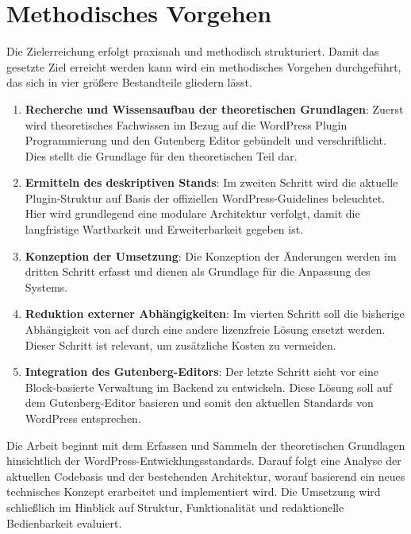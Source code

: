 \section{Methodisches Vorgehen}

Die Zielerreichung erfolgt praxisnah und methodisch strukturiert.
Damit das gesetzte Ziel erreicht werden kann wird ein methodisches Vorgehen durchgeführt, das sich in vier größere Bestandteile gliedern lässt.

\begin{enumerate}
    \item \textbf{Recherche und Wissensaufbau der theoretischen Grundlagen}: Zuerst wird theoretisches Fachwissen im Bezug auf die WordPress Plugin Programmierung und den Gutenberg Editor gebündelt und verschriftlicht.
    Dies stellt die Grundlage für den theoretischen Teil dar.

    \item \textbf{Ermitteln des deskriptiven Stands}: Im zweiten Schritt wird die aktuelle Plugin-Struktur auf Basis der offiziellen WordPress-Guidelines beleuchtet.
    Hier wird grundlegend eine modulare Architektur verfolgt, damit die langfristige Wartbarkeit und Erweiterbarkeit gegeben ist.

    \item \textbf{Konzeption der Umsetzung}: Die Konzeption der Änderungen werden im dritten Schritt erfasst und dienen als Grundlage für die Anpassung des Systems.

    \item \textbf{Reduktion externer Abhängigkeiten}: Im vierten Schritt soll die bisherige Abhängigkeit von \gls{acf} durch eine andere lizenzfreie Lösung ersetzt werden.
    Dieser Schritt ist relevant, um zusätzliche Kosten zu vermeiden.

    \item \textbf{Integration des Gutenberg-Editors}: Der letzte Schritt sieht vor eine Block-basierte Verwaltung im Backend zu entwickeln.
    Diese Lösung soll auf dem Gutenberg-Editor basieren und somit den aktuellen Standards von WordPress entsprechen.
\end{enumerate}

Die Arbeit beginnt mit dem Erfassen und Sammeln der theoretischen Grundlagen hinsichtlich der WordPress-Entwicklungsstandards.
Darauf folgt eine Analyse der aktuellen Codebasis und der bestehenden Architektur, worauf basierend ein neues technisches Konzept erarbeitet und implementiert wird.
Die Umsetzung wird schließlich im Hinblick auf Struktur, Funktionalität und redaktionelle Bedienbarkeit evaluiert.
